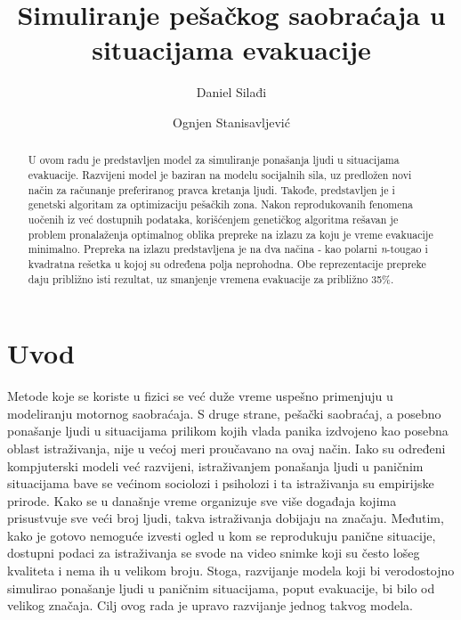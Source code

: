 \documentclass[12pt]{article}
\begin{document}
\title{\textbf{Simuliranje pešačkog saobraćaja u situacijama evakuacije}}

\author{
Daniel Silađi\\
\and
Ognjen Stanisavljević
}

\date{} %
\maketitle %


\begin{abstract}
U ovom radu je predstavljen model za simuliranje ponašanja ljudi u situacijama evakuacije. Razvijeni model je baziran na modelu socijalnih sila, uz predložen novi način za računanje preferiranog pravca kretanja ljudi. Takođe, predstavljen je i genetski algoritam za optimizaciju pešačkih zona. Nakon reprodukovanih fenomena uočenih iz već dostupnih podataka, korišćenjem genetičkog algoritma rešavan je problem pronalaženja optimalnog oblika prepreke na izlazu za koju je vreme evakuacije minimalno. Prepreka na izlazu predstavljena je na dva načina - kao polarni \emph{n}-tougao i kvadratna rešetka u kojoj su određena polja neprohodna. Obe reprezentacije prepreke daju približno isti rezultat, uz smanjenje vremena evakuacije za približno 35\%. 
\end{abstract}


\section{Uvod}

Metode koje se koriste u fizici se već duže vreme uspešno primenjuju u  modeliranju motornog saobraćaja. S druge strane, pešački saobraćaj, a posebno ponašanje ljudi u situacijama prilikom kojih vlada panika izdvojeno kao posebna oblast istraživanja, nije u većoj meri proučavano na ovaj način. Iako su određeni kompjuterski modeli već razvijeni, istraživanjem ponašanja ljudi u paničnim situacijama bave  se većinom sociolozi i psiholozi i ta istraživanja su empirijske prirode. Kako se u današnje vreme organizuje sve više događaja kojima prisustvuje sve veći broj ljudi, takva istraživanja dobijaju na značaju. Međutim, kako je gotovo nemoguće izvesti ogled u kom se reprodukuju panične situacije, dostupni podaci za istraživanja se svode na video snimke koji su često lošeg kvaliteta i nema ih u velikom broju. Stoga, razvijanje modela koji bi verodostojno simulirao ponašanje ljudi u paničnim situacijama, poput evakuacije, bi bilo od velikog značaja. Cilj ovog rada je upravo razvijanje jednog takvog modela.
\end{document}
